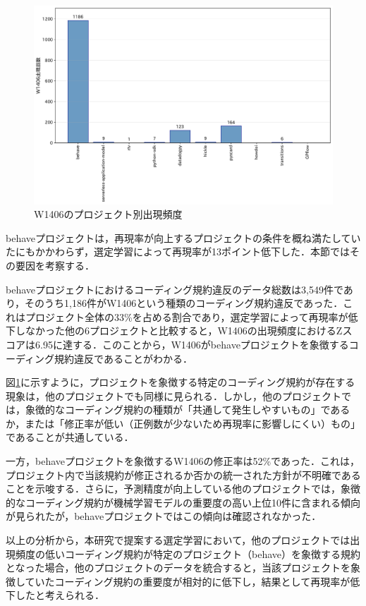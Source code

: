 \documentclass[submit]{ipsj}
\begin{document}
\begin{figure}[t]
	\centering
	\includegraphics[width=1\linewidth]{fig/w1406_project_comparison.pdf}
	\caption{W1406のプロジェクト別出現頻度}
	\label{fig:w1406}
\end{figure}

behaveプロジェクトは，再現率が向上するプロジェクトの条件を概ね満たしていたにもかかわらず，選定学習によって再現率が13ポイント低下した．本節ではその要因を考察する．

behaveプロジェクトにおけるコーディング規約違反のデータ総数は3,549件であり，そのうち1,186件がW1406という種類のコーディング規約違反であった．これはプロジェクト全体の33\%を占める割合であり，選定学習によって再現率が低下しなかった他の6プロジェクトと比較すると，W1406の出現頻度におけるZスコアは6.95に達する．このことから，W1406がbehaveプロジェクトを象徴するコーディング規約違反であることがわかる．

図\ref{fig:w1406}に示すように，プロジェクトを象徴する特定のコーディング規約が存在する現象は，他のプロジェクトでも同様に見られる．しかし，他のプロジェクトでは，象徴的なコーディング規約の種類が「共通して発生しやすいもの」であるか，または「修正率が低い（正例数が少ないため再現率に影響しにくい）もの」であることが共通している．

一方，behaveプロジェクトを象徴するW1406の修正率は52\%であった．これは，プロジェクト内で当該規約が修正されるか否かの統一された方針が不明確であることを示唆する．さらに，予測精度が向上している他のプロジェクトでは，象徴的なコーディング規約が機械学習モデルの重要度の高い上位10件に含まれる傾向が見られたが，behaveプロジェクトではこの傾向は確認されなかった．

以上の分析から，本研究で提案する選定学習において，他のプロジェクトでは出現頻度の低いコーディング規約が特定のプロジェクト（behave）を象徴する規約となった場合，他のプロジェクトのデータを統合すると，当該プロジェクトを象徴していたコーディング規約の重要度が相対的に低下し，結果として再現率が低下したと考えられる．
\end{document}

